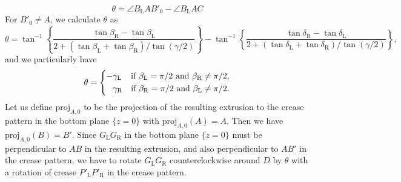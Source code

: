 \documentclass[11pt]{amsart}
\numberwithin{equation}{section}
\numberwithin{theorem}{section}
\newcommand{\Lt}{\ensuremath{\mathrm{L}}}
\newcommand{\Rt}{\ensuremath{\mathrm{R}}}
\newcommand{\proj}{\ensuremath{\mathrm{proj}}}
\begin{document}
\begin{equation*}
\theta =\angle B_\Lt AB'_0-\angle B_\Lt AC
\end{equation*}
For $B'_0\neq A$, we calculate $\theta$ as
\begin{equation}\label{eq:theta}
\theta =\tan^{-1}\left\{\frac{\tan\beta_\Rt -\tan\beta_\Lt}{2+(\tan\beta_\Lt +\tan\beta_\Rt )/\tan (\gamma /2)}\right\}
-\tan^{-1}\left\{\frac{\tan\delta_\Rt -\tan\delta_\Lt}{2+(\tan\delta_\Lt +\tan\delta_\Rt )/\tan (\gamma /2)}\right\} ,
\end{equation}
and we particularly have
\begin{equation*}
\theta=\begin{dcases}
-\gamma_\Lt&\text{if }\beta_\Lt =\pi /2\text{ and }\beta_\Rt\neq\pi /2,\\
\phantom{-}\gamma_\Rt&\text{if }\beta_\Rt =\pi /2\text{ and }\beta_\Lt\neq\pi /2.
\end{dcases}
\end{equation*}
Let us define $\proj_{A,0}$ to be the projection of the resulting extrusion to the crease pattern in the bottom plane $\{ z=0\}$ with $\proj_{A,0}(A)=A$.
Then we have $\proj_{A,0}(B)=B'$.
Since $G_\Lt G_\Rt$ in the bottom plane $\{ z=0\}$ must be perpendicular to $AB$ in the resulting extrusion, and also perpendicular to $AB'$ in the crease pattern,
we have to rotate $G_\Lt G_\Rt$ counterclockwise around $D$ by $\theta$ with a rotation of crease $P'_\Lt P'_\Rt$ in the crease pattern.
\end{document}
